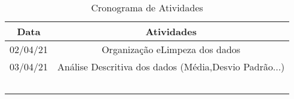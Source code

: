 \documentclass[conference]{IEEEtran}
\begin{document}
\begin{table}[h]
    \centering
    \begin{small}
        \caption{Cronograma de Atividades} \label{Tabela1}
        \begin{tabular}{cc}
            \hline
            Data                    & Atividades\\
            \hline
            02/04/21                & Organização eLimpeza dos dados \\
            03/04/21                & Análise Descritiva dos dados (Média,Desvio Padrão...)  \\
                                    &  \\
                                   &  \\
                                   &  \\
                                     &  \\
                                     &  \\
            \hline
        \end{tabular}
    \end{small}
\end{table}







\nocite{*}

\end{document}
